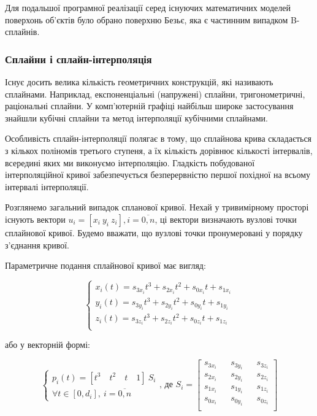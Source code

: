 \let\mypdfximage\pdfximage\def\pdfximage{\immediate\mypdfximage}\documentclass[14pt,a4paper]{extarticle}
\theoremstyle{definition}
\renewcommand{\[}{\begin{singlespace}\begin{equation*}}
\renewcommand{\]}{\end{equation*}\end{singlespace}}
\renewcommand{\+}{\discretionary{\mbox{\scriptsize$\hookleftarrow$}}{}{}}
\begin{document}
Для подальшої програмної реалізації серед існуючих математичних моделей поверхонь об'єктів було обрано поверхню Безьє, яка є частинним випадком B-сплайнів.

\subsubsection{Сплайни і сплайн-інтерполяція}

Існує досить велика кількість геометричних конструкцій, які називають сплайнами. Наприклад, експоненціальні (напружені) сплайни, тригонометричні, раціональні сплайни. У комп'ютерній графіці найбільш широке застосування знайшли кубічні сплайни та метод інтерполяції кубічними сплайнами.

Особливість сплайн-інтерполяції полягає в тому, що сплайнова крива складається з кількох поліномів третього ступеня, а їх кількість дорівнює кількості інтервалів, всередині яких ми виконуємо інтерполяцію. Гладкість побудованої інтерполяційної кривої забезпечується безперервністю першої похідної на всьому інтервалі інтерполяції.

Розглянемо загальний випадок спланової кривої. Нехай у тривимірному просторі існують вектори $u_i = [x_i\ y_i\ z_i], i=\overline{0,n}$, ці вектори визначають вузлові точки сплайнової кривої. Будемо вважати, що вузлові точки пронумеровані у порядку з’єднання кривої.


Параметричне подання сплайнової кривої має вигляд:
\[\left\{\begin{array}{l}
x_i(t)=s_{3x_i}t^3+s_{2x_i}t^2+s_{0x_i}t+s_{1x_i}\\
y_i(t)=s_{3y_i}t^3+s_{2y_i}t^2+s_{0y_i}t+s_{1y_i}\\
z_i(t)=s_{3z_i}t^3+s_{2z_i}t^2+s_{0z_i}t+s_{1z_i}\\
\end{array}\right.\]
або у  векторній формі:
\[\left\{\begin{array}{l}
p_i(t)=[t^3\quad t^2\quad t\quad 1]\ S_i\\
\forall t \in [0, d_i],\ i = \overline{0,n}
\end{array}\right.\text{, де }S_i=\left[\begin{matrix}
s_{3x_i} && s_{3y_i} && s_{3z_i} \\
s_{2x_i} && s_{2y_i} && s_{2z_i} \\
s_{1x_i} && s_{1y_i} && s_{1z_i} \\
s_{0x_i} && s_{0y_i} && s_{0z_i} \\
\end{matrix}\right]\]
\end{document}
